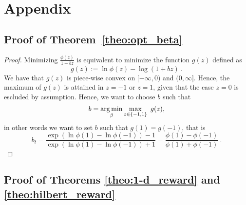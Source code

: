 \appendix
\section{Appendix}

\subsection{Proof of Theorem~\ref{theo:opt_beta}}
\begin{proof}
Minimizing $\frac{\phi(z)}{1+b z}$ is equivalent to minimize the function $g(z)$ defined as
\[
g(z) := \ln \phi(z) - \log(1+b z)~.
\]
We have that $g(z)$ is piece-wise convex on $[-\infty,0)$ and $(0,\infty]$. 
Hence, the maximum of $g(z)$ is attained in $z=-1$ or $z=1$, given that the case $z=0$ is escluded by assumption.
Hence, we want to choose $b$ such that
\[
b = \operatorname*{arg\,min}_{\beta} \max_{z \in \{-1, 1\}} \ g(z),
\]
in other words we want to set $b$ such that $g(1)=g(-1)$, that is
\[
b_t = \frac{\exp\left(\ln \phi(1) - \ln \phi(-1)\right)-1}{\exp\left(\ln \phi(1) - \ln \phi(-1)\right)+1} 
= \frac{\phi(1) - \phi(-1)}{\phi(1) + \phi(-1)}~.
\]
\end{proof}

\subsection{Proof of Theorems \ref{theo:1-d_reward} and \ref{theo:hilbert_reward}}

